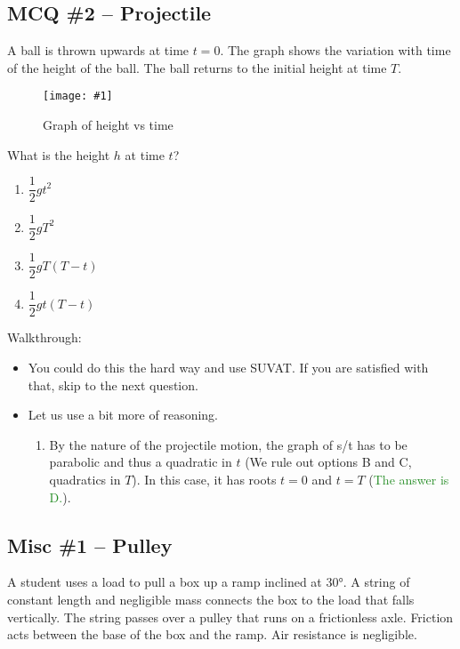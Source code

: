 \documentclass[a4paper,12pt]{article}
\newcommand{\img}[4]{\begin{center}
  \begin{figure}[H]
    \centering
    \texttt{[image: \#1]}
    \caption{#3}
    \label{fig:#4}
  \end{figure}
\end{center}}
\newcommand{\ans}[1]{\textcolor{ForestGreen}{The answer is #1.}}
\newcommand{\outs}[2]{\textcolor{BrickRed}{We rule out options #1 and #2}}
\begin{document}
\pagebreak

\subsection{MCQ \#2 -- Projectile}
A ball is thrown upwards at time $t = 0$. The graph shows the variation with time of the height of the ball. The ball returns to the initial height at time $T$.
\img{ex/1.png}{0.7}{Graph of height vs time}{heightvtime}
What is the height $h$ at time $t$?

\begin{enumerate}[label=\Alph*.]
  \item $\dfrac{1}{2}gt^2$
  \item $\dfrac{1}{2}gT^2$
  \item $\dfrac{1}{2}gT(T - t)$
  \item $\dfrac{1}{2}gt(T - t)$
\end{enumerate}

Walkthrough:
\begin{itemize}
  \item You could do this the hard way and use SUVAT. If you are satisfied with that, skip to the next question.
  \item Let us use a bit more of reasoning.
        \begin{enumerate}
          \item By the nature of the projectile motion, the graph of s/t has to be parabolic and thus a quadratic in $t$ (\outs{B}{C}, quadratics in $T$). In this case, it has roots $t = 0$ and $t = T$ (\ans{D}).

        \end{enumerate}
\end{itemize}

\pagebreak

\subsection{Misc \#1 -- Pulley}

A student uses a load to pull a box up a ramp inclined at 30°. A string of constant length and negligible mass connects the box to the load that falls vertically. The string passes over a pulley that runs on a frictionless axle. Friction acts between the base of the box and the ramp. Air resistance is negligible.
\end{document}
